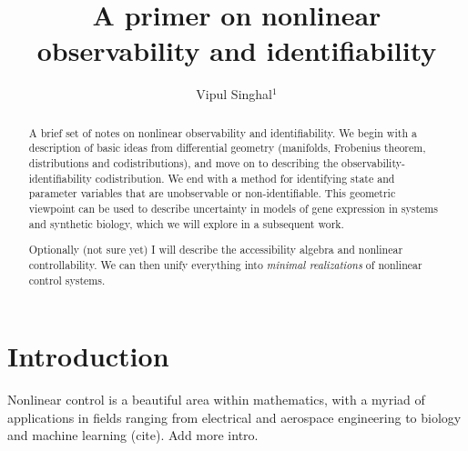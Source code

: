 \documentclass[psamsfonts]{amsart}
\title{A primer on nonlinear observability and identifiability} %
\author{Vipul Singhal$^{1}$}
\theoremstyle{definition}
\theoremstyle{remark}
\numberwithin{equation}{section}
\begin{document}
\begin{abstract}

A brief set of notes on nonlinear observability and identifiability. We begin with a description of basic ideas from differential geometry (manifolds, Frobenius theorem, distributions and codistributions), and move on to describing the observability-identifiability codistribution. We end with a method for identifying state and parameter variables that are unobservable or non-identifiable. This geometric viewpoint can be used to describe uncertainty in models of gene expression in systems and synthetic biology, which we will explore in a subsequent work. 

Optionally (not sure yet) I will describe the accessibility algebra and nonlinear controllability. We can then unify everything into \textit{minimal realizations} of nonlinear control systems. %
\end{abstract}

\maketitle
\tableofcontents

\section{Introduction} 
Nonlinear control is a beautiful area within mathematics, with a myriad of applications in fields ranging from electrical and aerospace engineering to biology and machine learning (cite). Add more intro. 
\end{document}
